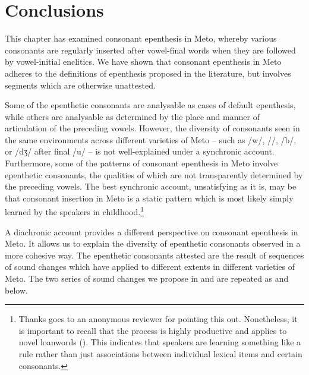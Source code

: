 \documentclass[output=paper]{langscibook}
\begin{document}
\section{Conclusions}\label{sec:Conc}
This chapter has examined consonant epenthesis in Meto, 
whereby various consonants are regularly inserted
after vowel-final words when they are followed by vowel-initial enclitics.
We have shown that consonant epenthesis in Meto adheres
to the definitions of epenthesis proposed in the literature, but
involves segments which are otherwise unattested.  
 
Some of the epenthetic consonants are 
analysable as cases of default epenthesis,
while others are analysable as 
determined by the place and manner of articulation of the preceding vowels.
However, the diversity of consonants seen in the same
environments across different varieties of Meto --
such as /w/, /\gw/, /b/, or /dʒ/ after final /u/ --
is not well-explained under a synchronic account.
Furthermore, some of  the patterns of
consonant epenthesis in Meto involve epenthetic consonants,
the qualities of which are not transparently determined by the preceding vowels.
The best synchronic account, unsatisfying as it is,
may be that consonant insertion in Meto is a static pattern which
is most likely simply learned by the speakers in childhood.\footnote{%
		Thanks goes to an anonymous reviewer for pointing this out.
		Nonetheless, it is important to recall that the process is highly
		productive and applies to novel loanwords ().
		This indicates that speakers are learning something like a rule
		rather than just associations between
		individual lexical items and certain consonants.}

A diachronic account provides a different perspective
on consonant epenthesis in Meto. It allows us to explain 
the diversity of epenthetic consonants observed in a more cohesive way.
The  epenthetic consonants  attested are the result of sequences of sound changes
which have applied to different extents in different varieties of Meto.
The two series of sound changes we propose in  and  are repeated as 
and  below.
\end{document}

